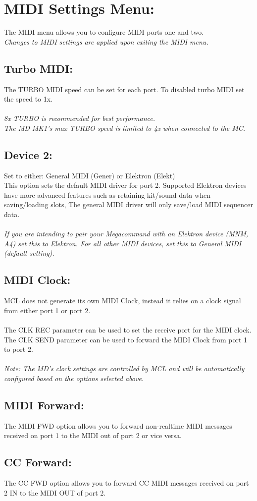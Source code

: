 \chapter{MIDI Settings Menu:}
The MIDI menu allows you to configure MIDI ports one and two.
\\
\textit{Changes to MIDI settings are applied upon exiting the MIDI menu.}
\section{Turbo MIDI:}
The TURBO MIDI speed can be set for each port. To disabled turbo MIDI set the speed to 1x.\\\\
\textit{8x TURBO is recommended for best performance.\\
The MD MK1's max TURBO speed is limited to 4x when connected to the MC.
}
\section{Device 2: }
Set to either: General MIDI (Gener) or Elektron (Elekt)\\

This option sets the default MIDI driver for port 2. Supported Elektron devices have
more advanced features such as retaining kit/sound data when saving/loading slots,
The general MIDI driver will only save/load MIDI sequencer data.\\
\\
\textit{If you are intending to pair your Megacommand with an Elektron device
(MNM, A4) set this to Elektron. For all other MIDI devices, set this to General MIDI (default setting).}
\section{MIDI Clock:}
MCL does not generate its own MIDI Clock, instead it relies on a clock signal from either port 1 or port 2.\\\\
The CLK REC parameter can be used to set the receive port for the MIDI clock.\\
The CLK SEND parameter can be used to forward the MIDI Clock from port 1 to port 2.\\\\
\textit{Note: The MD's clock settings are controlled by MCL and will be automatically configured based on the options selected above.}
\section{MIDI Forward:}
The MIDI FWD option allows you to forward non-realtime MIDI messages received on port 1 to the MIDI out of port 2 or vice versa.
\section{CC Forward:}
The CC FWD option allows you to forward CC MIDI messages received on port 2 IN to the MIDI OUT of port 2.
